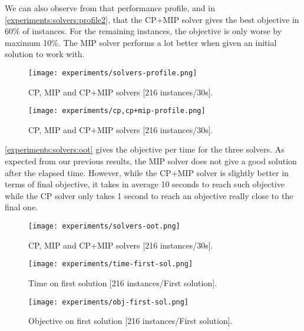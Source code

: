 \documentclass[../../thesis.tex]{subfiles}
\begin{document}
We can also observe from that performance profile, and in \autoref{experiments:solvers:profile2}, that 
the CP+MIP solver gives the best objective in 60\% of instances. For the remaining instances, the objective is only worse by maximum 10\%. 
The MIP solver performs a lot better when given an initial solution to work with.

\begin{figure}
  \centering
  \texttt{[image: experiments/solvers-profile.png]}
  \caption{CP, MIP and CP+MIP solvers [216 instances/30s].}
  \label{experiments:solvers:profile}
\end{figure}

\begin{figure}
  \centering
  \texttt{[image: experiments/cp,cp+mip-profile.png]}
  \caption{CP, MIP and CP+MIP solvers [216 instances/30s].}
  \label{experiments:solvers:profile2}
\end{figure}



\autoref{experiments:solvers:oot} gives the objective per time for the three solvers. As expected from our previous results, the MIP solver does not 
give a good solution after the elapsed time. However, while the CP+MIP solver is slightly better in terms of final objective, it takes in average 10 seconds 
to reach such objective while the CP solver only takes 1 second to reach an objective really close to the final one.



\begin{figure}
  \centering
  \texttt{[image: experiments/solvers-oot.png]}
  \caption{CP, MIP and CP+MIP solvers [216 instances/30s].}
  \label{experiments:solvers:oot}
\end{figure}


\begin{figure}
  \centering
  \texttt{[image: experiments/time-first-sol.png]}
  \caption{Time on first solution [216 instances/First solution].}
  \label{experiments:first-sol-time}
\end{figure}


\begin{figure}
  \centering
  \texttt{[image: experiments/obj-first-sol.png]}
  \caption{Objective on first solution [216 instances/First solution].}
  \label{experiments:first-sol-obj}
\end{figure}
\end{document}
